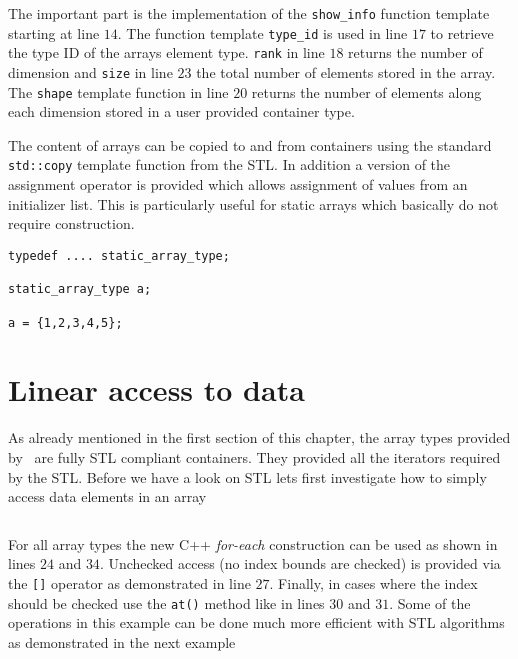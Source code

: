 \inputminted[fontsize=\small,
             linenos,
             firstline=24,
             frame=lines,
             label=examples/array\_inquery.cpp]
{cpp}{../examples/array_inquery.cpp}
The important part is the implementation of the \texttt{show\_info} function
template starting at line $14$. The function template \texttt{type\_id} is used in
line $17$ to retrieve the type ID of the arrays element type. \texttt{rank} in line
$18$ returns the number of dimension and \texttt{size} in line $23$ the total
number of elements stored in the array. 
The \texttt{shape} template function in line $20$ returns the number of elements
along each dimension stored in a user provided container type.

The content of arrays can be copied to and from containers using the standard 
\texttt{std::copy} template function from the STL. In addition a version of the
assignment operator is provided which allows assignment of values from an
initializer list. This is particularly useful for static arrays which basically
do not require construction. 
\begin{verbatim}
typedef .... static_array_type; 

static_array_type a;

a = {1,2,3,4,5};
\end{verbatim}

\section{Linear access to data}
As already mentioned in the first section of this chapter, the array types
provided by \libpnicore\ are fully STL compliant containers. They provided all
the iterators required by the STL. 
Before we have a look on STL lets first investigate how to simply access data
elements in an array

\inputminted[fontsize=\small,
             linenos,
             firstline=24,
             frame=lines,
             label=examples/array\_linear\_access.cpp]
{cpp}{../examples/array_linear_access.cpp}
For all array types the new C++ {\em for-each} construction can be used as shown
in lines $24$ and $34$. Unchecked access (no index bounds are checked) is
provided via the \texttt{[]} operator as demonstrated in line $27$. Finally, in
cases where the index should be checked use the \texttt{at()} method like in lines 
$30$ and $31$.
Some of the operations in this example can be done much more efficient with STL
algorithms as demonstrated in the next example


